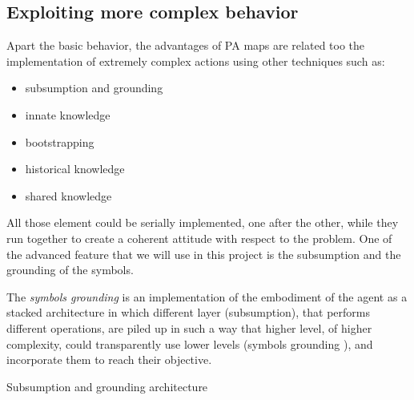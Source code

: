 \subsection{Exploiting more complex behavior}
Apart the basic behavior, the advantages of PA maps are related too the implementation of extremely complex actions using other techniques such as:
\begin{itemize}
\item subsumption and grounding
\item innate knowledge
\item bootstrapping
\item historical knowledge
\item shared knowledge
\end{itemize}
All those element could be serially implemented, one after the other, while they run together to create a coherent attitude with respect to the problem. One of the advanced feature that we will use in this project is the subsumption and the grounding of the symbols.

The \emph{symbols grounding} is an implementation of the embodiment of the agent as a stacked architecture in which different layer (subsumption), that performs different operations, are piled up in such a way that higher level, of higher complexity, could transparently use lower levels (symbols grounding \citep{harnad1990symbolgrounding}), and incorporate them to reach their objective.
\begin{marginfigure}
\caption{Subsumption and grounding architecture}
\end{marginfigure}

